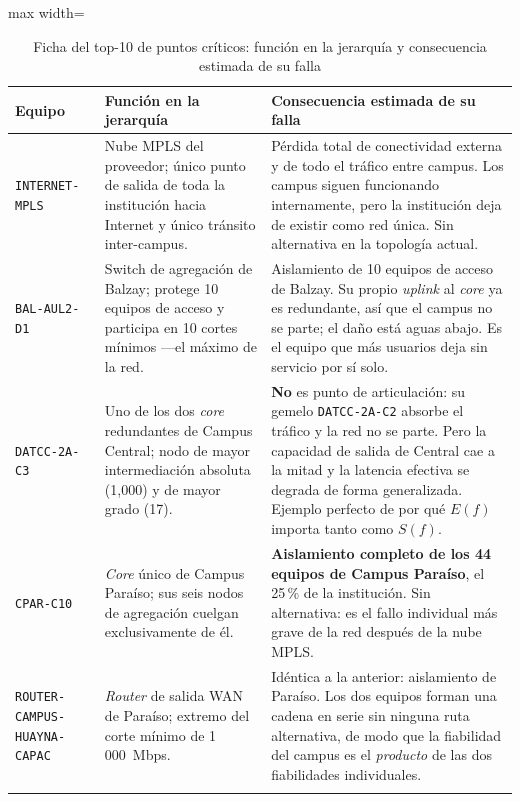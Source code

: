 \documentclass[10pt,a4paper]{extarticle}
\newcommand{\code}[1]{\texttt{\small #1}}
\begin{document}
\begin{table}[H]
\centering
\caption{Ficha del top-10 de puntos críticos: función en la jerarquía y consecuencia estimada de su falla}
\label{tab:fichas}
\scriptsize
\begin{adjustbox}{max width=\textwidth}
\begin{tabular}{p{3.0cm}p{5.1cm}p{5.5cm}}
\toprule
\textbf{Equipo} & \textbf{Función en la jerarquía} & \textbf{Consecuencia estimada de su falla} \\
\midrule
\code{INTERNET-MPLS} &
Nube MPLS del proveedor; único punto de salida de toda la institución hacia Internet y único
tránsito inter-campus. &
Pérdida total de conectividad externa y de todo el tráfico entre campus. Los campus siguen
funcionando internamente, pero la institución deja de existir como red única. Sin
alternativa en la topología actual. \\
\addlinespace
\code{BAL-AUL2-D1} &
Switch de agregación de Balzay; protege 10 equipos de acceso y participa en 10 cortes
mínimos ---el máximo de la red. &
Aislamiento de 10 equipos de acceso de Balzay. Su propio \textit{uplink} al \textit{core} ya
es redundante, así que el campus no se parte; el daño está aguas abajo. Es el equipo que más
usuarios deja sin servicio por sí solo. \\
\addlinespace
\code{DATCC-2A-C3} &
Uno de los dos \textit{core} redundantes de Campus Central; nodo de mayor intermediación
absoluta (1,000) y de mayor grado (17). &
\textbf{No} es punto de articulación: su gemelo \code{DATCC-2A-C2} absorbe el tráfico y la
red no se parte. Pero la capacidad de salida de Central cae a la mitad y la latencia efectiva
se degrada de forma generalizada. Ejemplo perfecto de por qué $E(f)$ importa tanto como
$S(f)$. \\
\addlinespace
\code{CPAR-C10} &
\textit{Core} único de Campus Paraíso; sus seis nodos de agregación cuelgan exclusivamente
de él. &
\textbf{Aislamiento completo de los 44 equipos de Campus Paraíso}, el 25\,\% de la
institución. Sin alternativa: es el fallo individual más grave de la red después de la nube
MPLS. \\
\addlinespace
\code{ROUTER-CAMPUS-} \code{HUAYNA-CAPAC} &
\textit{Router} de salida WAN de Paraíso; extremo del corte mínimo de 1\,000~Mbps. &
Idéntica a la anterior: aislamiento de Paraíso. Los dos equipos forman una cadena en serie
sin ninguna ruta alternativa, de modo que la fiabilidad del campus es el \textit{producto} de
las dos fiabilidades individuales. \\
\addlinespace

\end{tabular}
\end{adjustbox}
\end{table}
\end{document}
